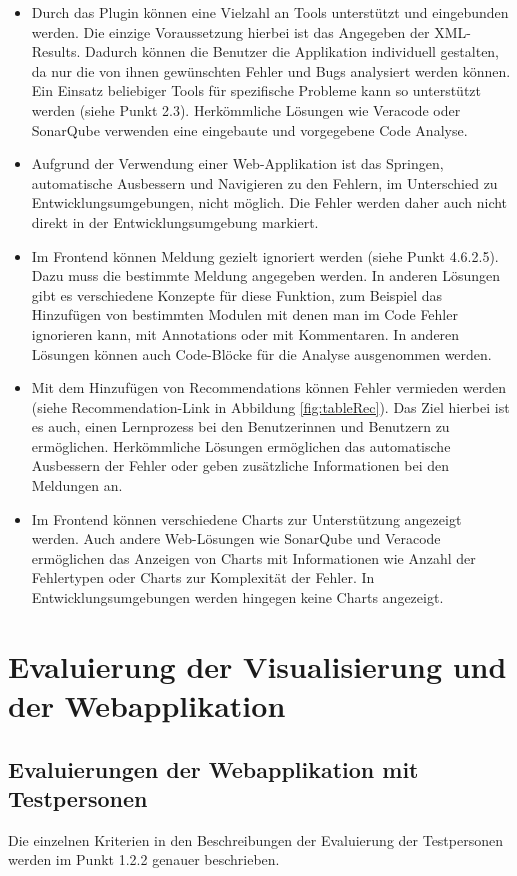 \begin{itemize}
\item Durch das Plugin können eine Vielzahl an Tools unterstützt und eingebunden werden. Die einzige Voraussetzung hierbei ist das Angegeben der XML-Results. Dadurch können die Benutzer die Applikation individuell gestalten, da nur die von ihnen gewünschten Fehler und Bugs analysiert werden können. Ein Einsatz beliebiger Tools für spezifische Probleme kann so unterstützt werden (siehe Punkt 2.3). Herkömmliche Lösungen wie Veracode oder SonarQube verwenden eine eingebaute und vorgegebene Code Analyse.
\item Aufgrund der Verwendung einer Web-Applikation ist das Springen, automatische Ausbessern und Navigieren zu den Fehlern, im Unterschied zu Entwicklungsumgebungen, nicht möglich. Die Fehler werden daher auch nicht direkt in der Entwicklungsumgebung markiert.
\item Im Frontend können Meldung gezielt ignoriert werden (siehe Punkt 4.6.2.5). Dazu muss die bestimmte Meldung angegeben werden. In anderen Lösungen gibt es verschiedene Konzepte für diese Funktion, zum Beispiel das Hinzufügen von bestimmten Modulen mit denen man im Code Fehler ignorieren kann, mit Annotations oder mit Kommentaren. In anderen Lösungen können auch Code-Blöcke für die Analyse ausgenommen werden.
\item Mit dem Hinzufügen von Recommendations können Fehler vermieden werden (siehe Recommendation-Link in Abbildung \ref{fig:tableRec}). Das Ziel hierbei ist es auch, einen Lernprozess bei den Benutzerinnen und Benutzern zu ermöglichen. Herkömmliche Lösungen ermöglichen das automatische Ausbessern der Fehler oder geben zusätzliche  Informationen bei den Meldungen an.



\item Im Frontend können verschiedene Charts zur Unterstützung angezeigt werden. Auch andere Web-Lösungen wie SonarQube und Veracode ermöglichen das Anzeigen von Charts mit Informationen wie Anzahl der Fehlertypen oder Charts zur Komplexität der Fehler. In Entwicklungsumgebungen werden hingegen keine Charts angezeigt.
\end{itemize}
\section{Evaluierung der Visualisierung und der Webapplikation} 

\subsection{Evaluierungen der Webapplikation mit Testpersonen}
Die einzelnen Kriterien in den Beschreibungen der Evaluierung der Testpersonen werden im Punkt 1.2.2 genauer beschrieben. 

